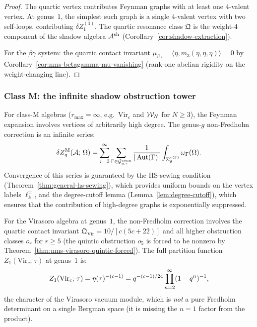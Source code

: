 \begin{proof}
The quartic vertex contributes Feynman graphs with at least one
$4$-valent vertex. At genus~$1$, the simplest such graph is a
single $4$-valent vertex with two self-loops, contributing
$\delta Z_1^{(4)}$. The quartic resonance class $\mathfrak{Q}$
is the weight-$4$ component of the shadow algebra $\mathcal{A}^{\mathrm{sh}}$
(Corollary~\ref{cor:shadow-extraction}).

For the $\beta\gamma$ system: the quartic contact invariant
$\mu_{\beta\gamma} = \langle \eta, m_3(\eta,\eta,\eta)\rangle = 0$
by Corollary~\ref{cor:nms-betagamma-mu-vanishing} (rank-one abelian
rigidity on the weight-changing line).
\end{proof}

\subsubsection{Class M: the infinite shadow obstruction tower}

\begin{remark}%
\label{rem:thqg-X-class-M-corrections}%
%
For class-M algebras ($r_{\max} = \infty$, e.g.\ $\mathrm{Vir}_c$
and $\mathcal{W}_N$ for $N \geq 3$), the Feynman expansion involves
vertices of arbitrarily high degree. The genus-$g$ non-Fredholm
correction is an infinite series:
\[
\delta Z_g^{\mathrm{M}}(\mathcal{A};\,\Omega)
= \sum_{r=3}^{\infty}
\sum_{\Gamma \in \mathcal{G}^{\mathrm{conn}}_{g,r}}
\frac{1}{|\operatorname{Aut}(\Gamma)|}
\int_{\Sigma_g^{v(\Gamma)}}
\omega_\Gamma(\Omega).
\]
Convergence of this series is guaranteed by the HS-sewing
condition (Theorem~\ref{thm:general-hs-sewing}), which provides
uniform bounds on the vertex labels $\ell_k^{\mathrm{tr}}$, and
the degree-cutoff lemma (Lemma~\ref{lem:degree-cutoff}), which
ensures that the contribution of high-degree graphs is
exponentially suppressed.

For the Virasoro algebra at genus~$1$, the non-Fredholm
correction involves the quartic contact invariant
$\mathfrak{Q}_{\mathrm{Vir}} = 10/[c(5c+22)]$
and all higher obstruction classes $o_r$ for $r \geq 5$
(the quintic obstruction $o_5$ is forced to be nonzero
by Theorem~\ref{thm:nms-virasoro-quintic-forced}). The full partition
function $Z_1(\mathrm{Vir}_c;\,\tau)$ at genus~$1$ is:
\[
Z_1(\mathrm{Vir}_c;\,\tau)
= \eta(\tau)^{-(c-1)}
= q^{-(c-1)/24}\prod_{n=2}^{\infty}(1-q^n)^{-1},
\]
the character of the Virasoro vacuum module, which is
\emph{not} a pure Fredholm determinant on a single Bergman space
(it is missing the $n=1$ factor from the product).
\end{remark}


